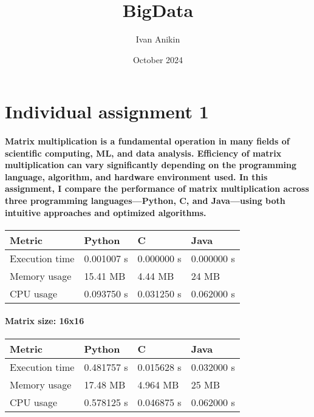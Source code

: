 \documentclass{article}
\title{BigData}
\author{Ivan Anikin}
\date{October 2024}
\begin{document}
\maketitle



\section{Individual assignment 1}

\paragraph{Matrix multiplication is a fundamental operation in many fields of scientific computing, ML, and data analysis. Efficiency of matrix multiplication can vary significantly depending on the programming language, algorithm, and hardware environment used. In this assignment, I compare the performance of matrix multiplication across three programming languages—Python, C, and Java—using both intuitive approaches and optimized algorithms. }

\hfill 
\newline


\begin{tabular}{| l | l | l | l |}
\hline
Metric & Python & C & Java \\ \hline
Execution time & 0.001007 s & 0.000000 s & 0.000000 s \\ \hline
Memory usage & 15.41 MB & 4.44 MB & 24 MB \\ \hline
CPU usage & 0.093750 s & 0.031250 s & 0.062000 s \\
\hline
\end{tabular}
\paragraph{Matrix size: 16x16}



\hfill 
\newline
\hfill 
\newline


\begin{tabular}{| l | l | l | l |}
\hline
Metric & Python & C & Java \\ \hline
Execution time & 0.481757 s & 0.015628 s & 0.032000 s \\ \hline
Memory usage & 17.48 MB & 4.964 MB & 25 MB \\ \hline
CPU usage & 0.578125 s & 0.046875 s & 0.062000 s \\
\hline
\end{tabular}
\end{document}
